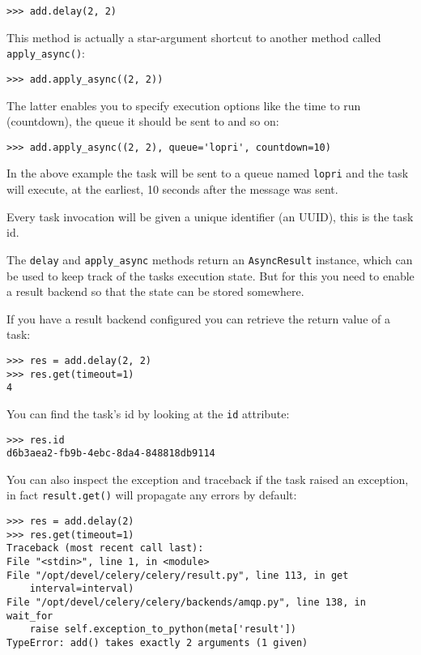 \documentclass[9pt,a4paper]{article}
\begin{document}
\begin{CJK*}{GBK}{kai}
\begin{Verbatim}[frame=single]
>>> add.delay(2, 2)
\end{Verbatim}

This method is actually a star-argument shortcut to another method called \verb"apply_async()":

\begin{Verbatim}[frame=single]
>>> add.apply_async((2, 2))
\end{Verbatim}

The latter enables you to specify execution options like the time to run (countdown), the queue it should be sent to and so on:

\begin{Verbatim}[frame=single]
>>> add.apply_async((2, 2), queue='lopri', countdown=10)
\end{Verbatim}

In the above example the task will be sent to a queue named \verb"lopri" and the task will execute, at the earliest, 10 seconds after the message was sent.

Every task invocation will be given a unique identifier (an UUID), this is the task id.

The \verb"delay" and \verb"apply_async" methods return an \verb"AsyncResult" instance, which can be used to keep track of the tasks execution state. But for this you need to enable a result backend so that the state can be stored somewhere.

If you have a result backend configured you can retrieve the return value of a task:

\begin{Verbatim}[frame=single]
>>> res = add.delay(2, 2)
>>> res.get(timeout=1)
4
\end{Verbatim}

You can find the task\textquoteright s id by looking at the \verb"id" attribute:

\begin{Verbatim}[frame=single]
>>> res.id
d6b3aea2-fb9b-4ebc-8da4-848818db9114
\end{Verbatim}

You can also inspect the exception and traceback if the task raised an exception, in fact \verb"result.get()" will propagate any errors by default:

\begin{Verbatim}[frame=single]
>>> res = add.delay(2)
>>> res.get(timeout=1)
Traceback (most recent call last):
File "<stdin>", line 1, in <module>
File "/opt/devel/celery/celery/result.py", line 113, in get
    interval=interval)
File "/opt/devel/celery/celery/backends/amqp.py", line 138, in wait_for
    raise self.exception_to_python(meta['result'])
TypeError: add() takes exactly 2 arguments (1 given)
\end{Verbatim}


\end{CJK*}
\end{document}
